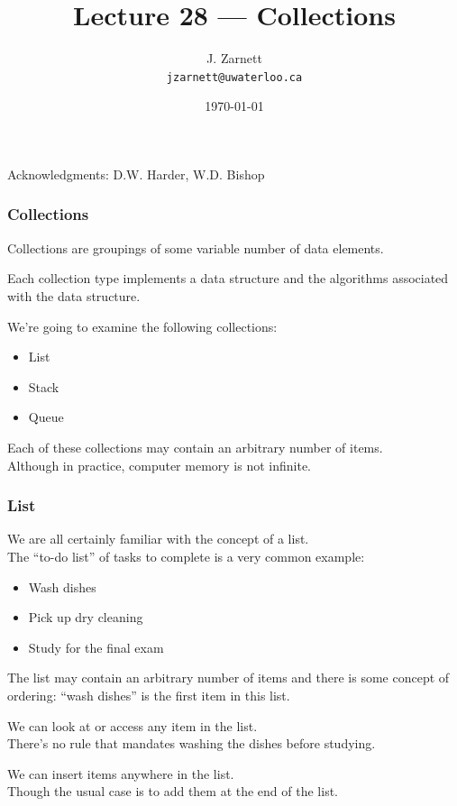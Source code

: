 

\title{Lecture 28 --- Collections}

\author{J. Zarnett\\
\texttt{jzarnett@uwaterloo.ca}}
\date{\today}



\begin{frame}
  \titlepage
  
  \begin{center}
  \small{Acknowledgments: D.W. Harder, W.D. Bishop}
  \end{center}
\end{frame}

\begin{frame}
\frametitle{Collections}

Collections are groupings of some variable number of data elements.

Each collection type implements a data structure and the algorithms associated with the data structure.

We're going to examine the following collections:

\begin{itemize}
	\item List
	\item Stack
	\item Queue
\end{itemize}

Each of these collections may contain an arbitrary number of items.\\
\quad Although in practice, computer memory is not infinite.

\end{frame}

\begin{frame}
\frametitle{List}

We are all certainly familiar with the concept of a list.\\
\quad The ``to-do list'' of tasks to complete is a very common example:
\begin{itemize}
	\item Wash dishes
	\item Pick up dry cleaning
	\item Study for the final exam
\end{itemize}

The list may contain an arbitrary number of items and there is some concept of ordering: ``wash dishes'' is the first item in this list.

We can look at or access any item in the list.\\
\quad There's no rule that mandates washing the dishes before studying.

We can insert items anywhere in the list.\\
\quad Though the usual case is to add them at the end of the list.

\end{frame}


